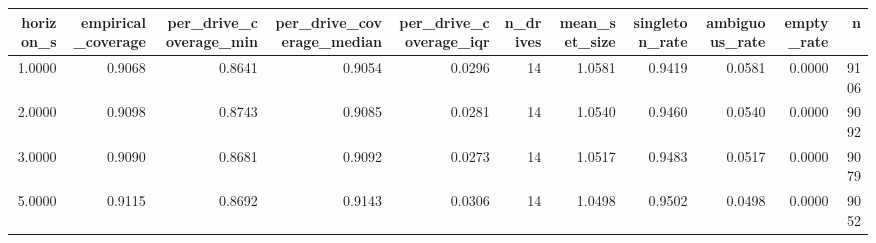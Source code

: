 \begin{tabular}{rrrrrrrrrrr}
\toprule
horizon\_s & empirical\_coverage & per\_drive\_coverage\_min & per\_drive\_coverage\_median & per\_drive\_coverage\_iqr & n\_drives & mean\_set\_size & singleton\_rate & ambiguous\_rate & empty\_rate & n \\
\midrule
1.0000 & 0.9068 & 0.8641 & 0.9054 & 0.0296 & 14 & 1.0581 & 0.9419 & 0.0581 & 0.0000 & 9106 \\
2.0000 & 0.9098 & 0.8743 & 0.9085 & 0.0281 & 14 & 1.0540 & 0.9460 & 0.0540 & 0.0000 & 9092 \\
3.0000 & 0.9090 & 0.8681 & 0.9092 & 0.0273 & 14 & 1.0517 & 0.9483 & 0.0517 & 0.0000 & 9079 \\
5.0000 & 0.9115 & 0.8692 & 0.9143 & 0.0306 & 14 & 1.0498 & 0.9502 & 0.0498 & 0.0000 & 9052 \\
\bottomrule
\end{tabular}
